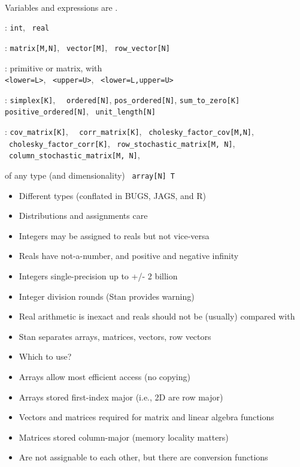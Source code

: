 \documentclass[10pt]{report}
\begin{document}
%
\\
\spc Variables and expressions are .
\begin{subitemize}
\item {}: {\tt\small int}, \ {\tt\small real}
\item {}: {\tt\small matrix[M,N]}, \ {\tt\small vector[M]}, \ {\tt\small row\_vector[N]}
\item {}: primitive or matrix, with
  \\ {\tt\small <lower=L>}, \ {\tt\small <upper=U>}, \ {\tt\small <lower=L,upper=U>}
\item {}: {\tt\small simplex[K]}, \ {\tt\small
    ordered[N]}, {\tt\small pos\_ordered[N]}, {\tt\small sum\_to\_zero[K]}
  \\ {\tt\small positive\_ordered[N]}, \ {\tt\small unit\_length[N]}
\item {}: {\tt\small cov\_matrix[K]}, \ {\tt\small
    corr\_matrix[K]}, \ {\tt\small cholesky\_factor\_cov[M,N]}, \
  {\tt\small cholesky\_factor\_corr[K]}, \ {\tt\small row\_stochastic\_matrix[M, N]},
  \ {\tt\small column\_stochastic\_matrix[M, N]}, 
\item {}  of any type (and dimensionality) \ {\tt\small array[N] T}
\end{subitemize}


%
\begin{itemize}
\item Different types (conflated in BUGS, JAGS, and R)
\item Distributions and assignments care
\item Integers may be assigned to reals but not vice-versa
\item Reals have not-a-number, and positive and negative infinity
\item Integers single-precision up to +/- 2 billion
\item Integer division rounds (Stan provides warning)
\item Real arithmetic is inexact and reals should not be (usually) compared with \code{==}
\end{itemize}


%
\begin{itemize}
\item Stan separates arrays, matrices, vectors, row vectors
\item Which to use?
\item Arrays allow most efficient access (no copying)
\item Arrays stored first-index major (i.e., 2D are row major)
\item Vectors and matrices required for matrix and linear algebra functions
\item Matrices stored column-major (memory locality matters)
\item Are not assignable to each other, but there are conversion functions
\end{itemize}
\end{document}
